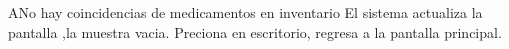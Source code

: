 \begin{UCtrayectoriaA}{A}{No hay coincidencias de medicamentos en inventario}
	\UCpaso El sistema actualiza la pantalla ,la muestra vacia.
	\UCpaso [\UCactor] Preciona en escritorio, regresa a la pantalla principal.
\end{UCtrayectoriaA}
